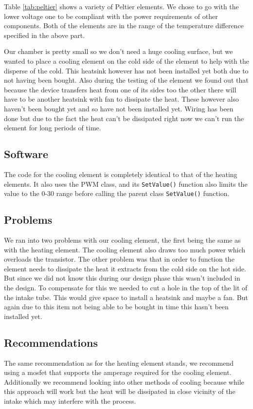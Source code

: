\documentclass[a4paper,oneside]{book}
\begin{document}
Table \ref{tab:peltier} shows a variety of Peltier elements. We chose to go
with the lower voltage one to be compliant with the power requirements of other
components. Both of the elements are in the range of the temperature difference
specified in the above part.

Our chamber is pretty small so we don't need a huge cooling surface, but we
wanted to place a cooling element on the cold side of the element to help with
the disperse of the cold. This heatsink however has not been installed yet both
due to not having been bought. Also during the testing of the element we found
out that because the device transfers heat from one of its sides too the other
there will have to be another heatsink with fan to dissipate the heat. These
however also haven't been bought yet and so have not been installed yet. Wiring
has been done but due to the fact the heat can't be dissipated right now we
can't run the element for long periods of time.

\subsection{Software}
The code for the cooling element is completely identical to that of the heating
elements. It also uses the PWM class, and its \lstinline|SetValue()| function
also limits the value to the 0-30 range before calling the parent class
\lstinline|SetValue()| function.

\subsection{Problems}
We ran into two problems with our cooling element, the first being the same as
with the heating element. The cooling element also draws too much power which
overloads the transistor. The other problem was that in order to function the
element needs to dissipate the heat it extracts from the cold side on the hot
side. But since we did not know this during our design phase this wasn’t
included in the design. To compensate for this we needed to cut a hole in the
top of the lit of the intake tube. This would give space to install a heatsink
and maybe a fan. But again due to this item not being able to be bought in time
this hasn't been installed yet.

\subsection{Recommendations}
The same recommendation as for the heating element stands, we recommend using a
mosfet that supports the amperage required for the cooling element.
Additionally we recommend looking into other methods of cooling because while
this approach will work but the heat will be dissipated in close vicinity of
the intake which may interfere with the process.
\end{document}
